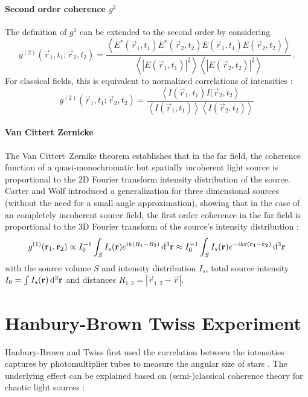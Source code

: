 \paragraph{Second order coherence $g^2$}
The definition of $g^1$ can be extended to the second order by considering
\begin{equation*}
	g^{(2)}(\vec{r}_1,t_1;\vec{r}_2,t_2)= 
	\frac{\left< E^*(\vec{r}_1,t_1)E^*(\vec{r}_2,t_2)E(\vec{r}_1,t_1)E(\vec{r}_2,t_2) \right>}{\left<\left | E(\vec{r}_1,t_1)\right |^2 \right> \left< \left |E(\vec{r}_2,t_2)\right |^2 \right>} \,.	
\end{equation*}
For classical fields, this is equivalent  to normalized correlations of intensities \cite{goodman2000}:
\begin{equation}
	g^{(2)}(\vec{r}_1,t_1;\vec{r}_2,t_2)= 
		\frac{\left< I(\vec{r}_1,t_1)I(\vec{r}_2,t_2 \right>}{\left<I(\vec{r}_1,t_1)\right>\left<I(\vec{r}_2,t_2)\right>}	
		\label{eq:g2}
\end{equation}


\paragraph{Van Cittert Zernicke}
The Van Cittert–Zernike theorem establishes that in the far field, the coherence function of a 
quasi-monochromatic but spatially incoherent light source is proportional to the 2D Fourier transform intensity distribution of the source. Carter and Wolf introduced a generalization for three dimensional sources (without the need for a small angle approximation), showing that in the case of an completely incoherent source field, the first order coherence in the far field is proportional to the 3D Fourier transform of the source's intensity distribution \cite{rosen1996, goodman2005, carter1981}:
\begin{equation}
	g^{(1)}(\mathbf{r}_1,\mathbf{r}_2) \propto I_0^{-1} \int_{S} I_s(\mathbf{r}) e^{ik(R_1-R_2)} \operatorname{\mathrm{d}^3 \!} \mathbf{r} \approx I_0^{-1} \int_{S} I_s(\mathbf{r}) e^{-ik\mathbf{r}(\mathbf{r_1}-\mathbf{r_2})} \operatorname{\mathrm{d}^3 \!} \mathbf{r}
	\label{eq:vcz}
\end{equation}
with the source volume $S$ and intensity distribution $I_s$, total source intensity $I_0=\int I_s(\mathbf{r}) \operatorname{\mathrm{d}^3 \!} \mathbf{r}$ and distances $R_{1,2}=\left|\vec{r}_{1,2}-\vec{r}\right|$.


\section{Hanbury-Brown Twiss Experiment}
Hanbury-Brown and Twiss first used the correlation between the intensities captures by photomultiplier tubes to measure the angular size of stars  \cite{hanbury1956}. The underlying effect can be explained based on (semi-)classical coherence theory for chaotic light sources \cite{baym1997,goodman2000}:

